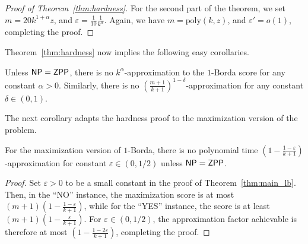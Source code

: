 \begin{proof}[Proof of Theorem~\ref{thm:hardness}]
For the second part of the theorem, we set $m = 20 k^{1+\alpha} z$, and $\varepsilon = \frac{1}{10} \frac{1}{k^{\alpha}}$. Again, we have $m = \mbox{poly}(k,z)$, and $\varepsilon' = o(1)$, completing the proof.
\end{proof}

Theorem~\ref{thm:hardness} now implies the following easy corollaries.
\begin{corollary}
Unless $\mathsf{NP} = \mathsf{ZPP}$, there is no $k^{\alpha}$-approximation to the $1$-Borda score for any constant $\alpha > 0$. Similarly, there is no $\left( \frac{m+1}{k+1} \right)^{1-\delta}$-approximation for any constant $\delta \in (0,1)$.
\end{corollary}

The next corollary adapts the hardness proof to the maximization version of the problem.

\begin{corollary}
For the maximization version of $1$-Borda, there is no polynomial time $\left(1 - \frac{1 - \varepsilon}{k+1} \right)$-approximation for constant $\varepsilon \in (0,1/2)$ unless $\mathsf{NP} = \mathsf{ZPP}$.
\end{corollary}
\begin{proof}
Set $\varepsilon > 0$ to be a small constant in the proof of Theorem~\ref{thm:main_lb}. Then, in the ``NO'' instance, the maximization score is at most $(m+1) \left(1 - \frac{1 - \varepsilon}{k+1} \right)$, while for the ``YES'' instance, the score is at least $(m+1) \left( 1 - \frac{\varepsilon}{k+1} \right)$. For $\varepsilon \in (0,1/2)$, the approximation factor achievable is therefore at most $\left( 1 - \frac{1-2\varepsilon}{k+1} \right)$, completing the proof.
\end{proof}






